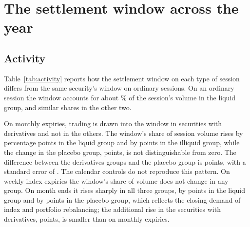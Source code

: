 \section{The settlement window across the year}\label{sec:window}

\subsection{Activity}

Table~\ref{tab:activity} reports how the settlement window on each type of session differs
from the same security's window on ordinary sessions. On an ordinary session the window
accounts for about \ActWindowshareLiquidNormal{}\% of the session's volume in the liquid
group, and similar shares in the other two.

\begin{table}[htbp]
\centering
\small
\caption{Activity in the settlement window by type of session. Each entry is the coefficient
on an indicator for the session type in a regression with security fixed effects, estimated
separately for each group, and measures the difference from ordinary sessions of the same
security. The last column is the difference between the securities with derivatives and the
placebo group, estimated with security and session fixed effects. Standard errors clustered
by session in parentheses. $^{*}$, $^{**}$ and $^{***}$ denote significance at the ten, five
and one per cent levels.}
\label{tab:activity}
\resizebox{\textwidth}{!}{}
\end{table}

On monthly expiries, trading is drawn into the window in securities with derivatives and not
in the others. The window's share of session volume rises by \ActWindowshareLiquidMonthlyexpiry{}
percentage points in the liquid group and by \ActWindowshareIlliquidMonthlyexpiry{} points
in the illiquid group, while the change in the placebo group, \ActWindowsharePlaceboMonthlyexpiry{}
points, is not distinguishable from zero. The difference between the derivatives groups and
the placebo group is \ActWindowshareDidMonthlyexpiry{} points, with a standard error of
\ActWindowshareDidMonthlyexpirySe{}. The calendar controls do not reproduce this pattern. On weekly
index expiries the window's share of volume does not change in any group. On month ends it
rises sharply in all three groups, by \ActWindowshareLiquidMonthend{} points in the liquid
group and by \ActWindowsharePlaceboMonthend{} points in the placebo group, which reflects the
closing demand of index and portfolio rebalancing; the additional rise in the securities with
derivatives, \ActWindowshareDidMonthend{} points, is smaller than on monthly expiries.

